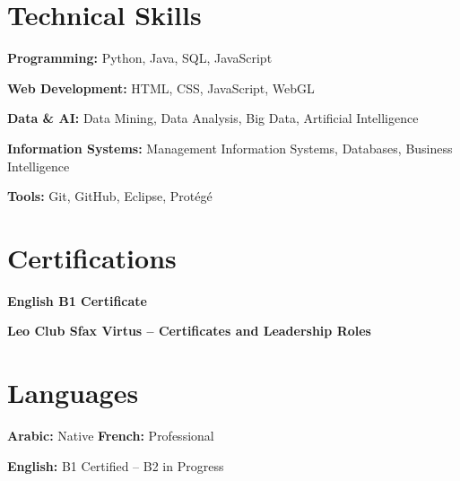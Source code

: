 \documentclass[a4paper,10pt]{article}
\begin{document}

\section*{Technical Skills}

\textbf{Programming:}
Python, Java, SQL, JavaScript
\vspace{2pt}


\textbf{Web Development:}
HTML, CSS, JavaScript, WebGL

\vspace{2pt}

\textbf{Data \& AI:}
Data Mining, Data Analysis, Big Data, Artificial Intelligence

\vspace{2pt}

\textbf{Information Systems:}
Management Information Systems, Databases, Business Intelligence

\vspace{2pt}

\textbf{Tools:}
Git, GitHub, Eclipse, Protégé



\section*{Certifications}

\noindent
\textbf{English B1 Certificate}

\vspace{2pt}

\noindent
\textbf{Leo Club Sfax Virtus -- Certificates and Leadership Roles}



\section*{Languages}

\noindent
\textbf{Arabic:} Native
\hfill
\textbf{French:} Professional

\vspace{2pt}

\noindent
\textbf{English:} B1 Certified -- B2 in Progress
\end{document}
